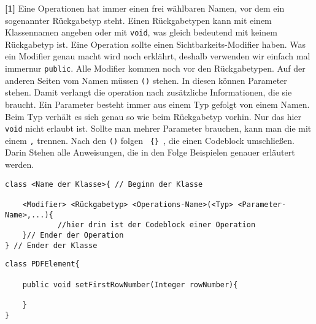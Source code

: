 \begin{enumerate}
          \textbf{[1]} Eine Operationen hat immer einen frei wählbaren Namen, vor dem ein sogenannter Rückgabetyp steht.
          Einen Rückgabetypen kann mit einem Klassennamen angeben oder mit \lstinline{void}, was gleich bedeutend mit keinem      Rückgabetyp ist.
          Eine Operation sollte einen Sichtbarkeits-Modifier haben.
          Was ein Modifier genau macht wird noch erklährt, deshalb verwenden wir einfach mal immernur \lstinline{public}.
          Alle Modifier kommen noch vor den Rückgabetypen.
          Auf der anderen Seiten vom Namen müssen \lstinline{()} stehen.
          In diesen können Parameter stehen. Damit verlangt die operation nach zusätzliche Informationen, die sie braucht. Ein Parameter besteht immer aus einem Typ gefolgt von einem Namen.
          Beim Typ verhält es sich genau so wie beim Rückgabetyp vorhin. Nur das hier \lstinline{void} nicht erlaubt ist.
          Sollte man mehrer Parameter brauchen, kann man die mit einem \lstinline{,} trennen.
          Nach den \lstinline{()} folgen \texttt{ \{\} }, die einen Codeblock umschließen. Darin Stehen alle Anweisungen, die in den Folge Beispielen genauer erläutert werden.

          \begin{lstlisting}[title={\textbf{Klassen Syntax}}]
class <Name der Klasse>{ // Beginn der Klasse

    <Modifier> <Rückgabetyp> <Operations-Name>(<Typ> <Parameter-Name>,...){
            //hier drin ist der Codeblock einer Operation
    }// Ender der Operation
} // Ender der Klasse
                \end{lstlisting}
          \begin{lstlisting}[title={\textbf{Klassen Beispiel}}]
class PDFElement{
        
    public void setFirstRowNumber(Integer rowNumber){
                
    }                    
}
                                    \end{lstlisting}
          


\end{enumerate}
